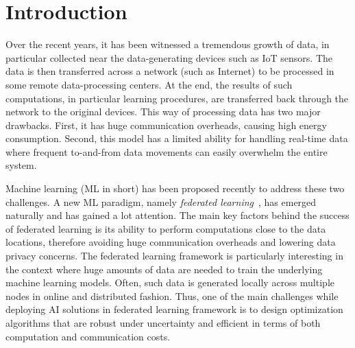\section{Introduction}
\label{chap:intro}

%

Over the recent years, it has been witnessed a tremendous growth of data, in particular collected near the data-generating devices such as IoT sensors. 
The data is then transferred across a network (such as Internet) to be processed in some remote data-processing centers. 
At the end, the results of such computations, in particular learning procedures, are transferred back through the network to the original devices.
%
This way of processing data has two major drawbacks.
First, it has huge communication overheads, causing high energy consumption.
Second, this model has a limited ability for handling real-time data where frequent to-and-from data movements can easily overwhelm the entire system.

Machine learning (ML in short) has been proposed recently to address these two challenges. A new ML paradigm, namely \emph{federated learning}~\cite{McMahanothers:Advances-and-Open}, has emerged naturally and has gained a lot attention. The main key factors behind the success of federated learning 
is its ability to perform computations close to the data locations, therefore avoiding huge communication overheads and lowering data privacy concerns. 
%
%
The federated learning framework is particularly interesting in the context where huge amounts of data are needed to train the underlying machine learning models. 
Often, such data is generated locally across multiple nodes in online and distributed fashion. 
Thus, one of the main challenges while deploying AI solutions in federated learning framework is to design optimization algorithms that are robust under uncertainty and efficient in terms of both computation and communication costs. 

